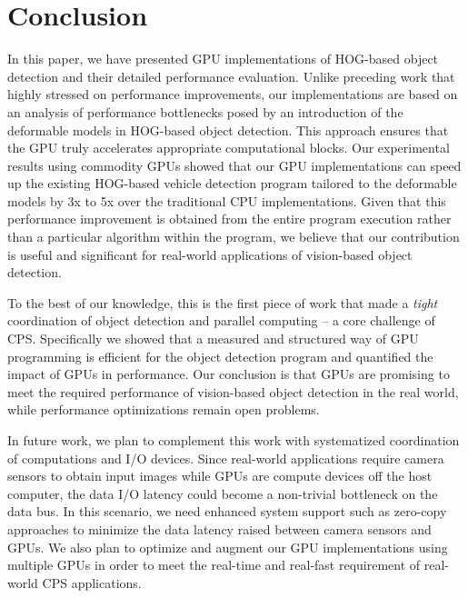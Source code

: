 \section{Conclusion}
\label{sec:conclusion}

In this paper, we have presented GPU implementations of HOG-based object
detection and their detailed performance evaluation.
Unlike preceding work that highly stressed on performance improvements,
our implementations are based on an analysis of performance bottlenecks
posed by an introduction of the deformable models in HOG-based object
detection.
This approach ensures that the GPU truly accelerates appropriate
computational blocks.
Our experimental results using commodity GPUs showed that our GPU
implementations can speed up the existing HOG-based vehicle detection
program tailored to the deformable models by 3x to 5x over the
traditional CPU implementations.
Given that this performance improvement is obtained from the entire
program execution rather than a particular algorithm within the program,
we believe that our contribution is useful and significant for
real-world applications of vision-based object detection.

To the best of our knowledge, this is the first piece of work that made
a \textit{tight} coordination of object detection and parallel computing
-- a core challenge of CPS.
Specifically we showed that a measured and structured way of GPU
programming is efficient for the object detection program and quantified
the impact of GPUs in performance.
Our conclusion is that GPUs are promising to meet the required
performance of vision-based object detection in the real world, while
performance optimizations remain open problems.

In future work, we plan to complement this work with systematized
coordination of computations and I/O devices.
Since real-world applications require camera sensors to obtain input
images while GPUs are compute devices off the host computer, the data
I/O latency could become a non-trivial bottleneck on the data bus.
In this scenario, we need enhanced system support such as zero-copy
approaches \cite{Kato13} to minimize the data latency raised between
camera sensors and GPUs.
We also plan to optimize and augment our GPU implementations using
multiple GPUs in order to meet the real-time and real-fast requirement
of real-world CPS applications.
